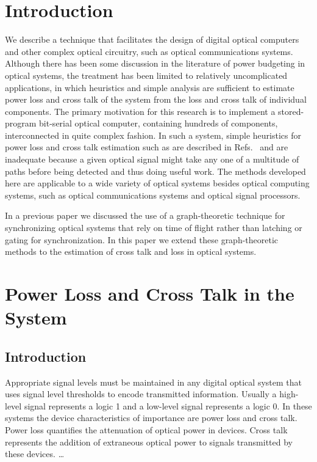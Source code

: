 \section{ Introduction}
We describe a technique that facilitates the design of digital optical
computers and other complex optical circuitry, such as optical
communications systems.  Although there has been some discussion in the
literature of power budgeting in optical systems,\cite{1,2} the treatment
has been limited to relatively uncomplicated applications, in which
heuristics and simple analysis are sufficient to estimate power loss and
cross talk of the system from the loss and cross talk of individual
components.  The primary motivation for this research is to implement a
stored-program bit-serial optical computer,\cite{3,4} containing hundreds
of components, interconnected in quite complex fashion.  In such a system,
simple heuristics for power loss and cross talk estimation such as are
described in Refs.\  and  are inadequate
because a given optical signal might take any one of a multitude of paths
before being detected and thus doing useful work.  The methods developed
here are applicable to a wide variety of optical systems besides optical
computing systems, such as optical communications systems and optical
signal processors.

In a previous paper\cite{5} we discussed the use of a graph-theoretic
technique for synchronizing optical systems that rely on time of flight
rather than latching or gating for synchronization.  In this paper we
extend these graph-theoretic methods to the estimation of cross talk and
loss in optical systems.

\section{Power Loss and Cross Talk in the System}

\subsection{ Introduction}
Appropriate signal levels must be maintained in any digital optical system
that uses signal level thresholds to encode transmitted information.
Usually a high-level signal represents a logic 1 and a low-level signal
represents a logic 0.  In these systems the device characteristics of
importance are power loss and cross talk.  Power loss quantifies the
attenuation of optical power in devices.  Cross talk represents the
addition of extraneous optical power to signals transmitted by these
devices.  \ldots

